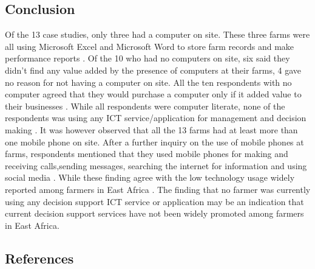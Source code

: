 \documentclass{article}
\begin{document}
\subsection{Conclusion}
Of the 13 case studies, only three  had a computer on site. These three farms were all
using Microsoft Excel and Microsoft Word to store farm records and make performance
reports \cite{r1}. Of the 10 who had no computers on site, six said they didn’t find any value added by the presence of computers at their farms, 4 gave no reason for not having a
computer on site. All the ten respondents  with no computer agreed that they would
purchase a computer only if it added value to their businesses \cite{r1}. While all respondents were computer literate, none of the respondents was using any ICT service/application for management and decision making \cite{r1}. It was however observed that all the 13 farms had at least more than one mobile phone on site. After a further inquiry on the use of mobile phones at farms, respondents mentioned that they used mobile phones for making and receiving calls,sending messages, searching the internet for information and using social media \cite{r1}. While these finding agree with the low technology usage widely reported among farmers in East Africa \cite{r3}. The finding that no farmer was currently using any decision support ICT service or application may be an indication that current decision support services have not been widely promoted among farmers in East Africa.
\subsection{References}


\end{document}
